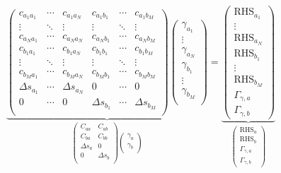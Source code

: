 	\begin{equation}
	\underbrace{\begin{pmatrix}
		c_{a_1a_1} & \cdots & c_{a_1a_N} & c_{a_1b_1} &\cdots & c_{a_1b_M}\\
		\vdots & \ddots & \vdots & \vdots &\ddots & \vdots\\
		c_{a_Na_1} & \cdots & c_{a_Na_N} & c_{a_Nb_1} &\cdots & c_{a_Nb_M}\\
		c_{b_1a_1} & \cdots & c_{b_1a_N} & c_{b_1b_1} &\cdots & c_{b_1b_M}\\
		\vdots & \ddots & \vdots & \vdots &\ddots & \vdots\\
		c_{b_Ma_1} & \cdots & c_{b_Ma_N} & c_{b_Mb_1} &\cdots & c_{b_Mb_M}\\
		\Delta s_{a_1} & \cdots & \Delta s_{a_N} & 0 & \cdots & 0\\
		0 & \cdots & 0 & \Delta s_{b_1} & \cdots & \Delta s_{b_M}\\
	\end{pmatrix}
	\begin{pmatrix}
		\gamma_{a_1}\\
		\vdots\\
		\gamma_{a_N}\\
		\gamma_{b_1}\\
		\vdots\\
		\gamma_{b_M}\\
	\end{pmatrix}}_{\begin{pmatrix}
						C_{aa} & C_{ab} \\
						C_{ba} & C_{bb} \\
						\Delta s_a & 0\\
						0 & \Delta s_b \\
					\end{pmatrix} \begin{pmatrix}
								\gamma_{a}\\
								\gamma_{b}\\
							\end{pmatrix}} 
	= 
	\underbrace{\begin{pmatrix}
		\mathrm{RHS}_{a_1}\\
		\vdots\\
		\mathrm{RHS}_{a_N}\\
		\mathrm{RHS}_{b_1}\\
		\vdots\\
		\mathrm{RHS}_{b_M}\\
		\Gamma_{\gamma,a}\\	
	\Gamma_{\gamma,b}
	\end{pmatrix}}_{ 
			\begin{pmatrix}
				\mathrm{RHS}_{a}\\
				\mathrm{RHS}_{b}\\
				\Gamma_{\gamma,a}\\	
				\Gamma_{\gamma,b}
			\end{pmatrix}}
	\end{equation}

